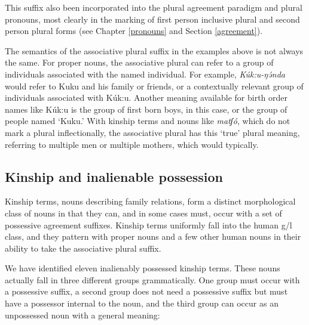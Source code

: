 This suffix also been incorporated into the plural agreement paradigm and plural pronouns, most clearly in the marking of first person inclusive plural and second person plural forms (see Chapter \ref{pronouns} and Section \ref{agreement}).

The semantics of the associative plural suffix in the examples above is not always the same. For proper nouns, the associative plural can refer to a group of individuals associated with the named individual. For example, \textit{Kúk:u-ŋə́nda} would refer to Kuku and his family or friends, or a contextually relevant group of individuals associated with Kúk:u. Another meaning available for birth order names like Kúk:u is the group of first born boys, in this case, or the group of people named `Kuku.' With kinship terms and nouns like \textit{matʃó}, which do not mark a plural inflectionally, the associative plural has this `true' plural meaning, referring to multiple men or multiple mothers, which would typically. 



\subsection{Kinship and inalienable possession}\label{sec:ch6:kinship}

Kinship terms, nouns describing family relations, form a distinct morphological class of nouns in that they can, and in some cases must, occur with a set of possessive agreement suffixes.  Kinship terms uniformly fall into the human g/l class, and they pattern with proper nouns and a few other human nouns in their ability to take the associative plural suffix. 

We have identified eleven inalienably possessed kinship terms. These nouns actually fall in three different groups grammatically. One group must occur with a possessive suffix, a second group does not need a possessive suffix but must have a possessor internal to the noun, and the third group can occur as an unpossessed noun with a general meaning:

